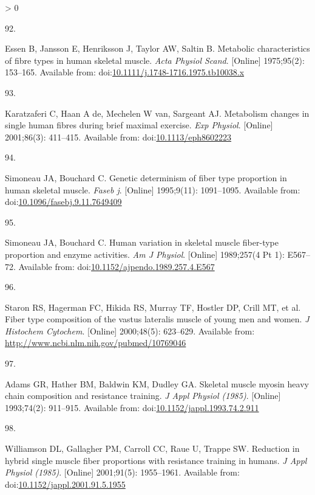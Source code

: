 \documentclass[twoside,10pt]{gihclass} %
\newlength{\cslhangindent}
\newlength{\csllabelwidth}
\newenvironment{CSLReferences}[3] %
 {%
  \setlength{\parindent}{0pt}
  \ifodd #1 \everypar{\setlength{\hangindent}{\cslhangindent}}\ignorespaces\fi
  \ifnum #2 > 0
  \setlength{\parskip}{#2\baselineskip}
  \fi
 }%
 {}
\newcommand{\CSLLeftMargin}[1]{\parbox[t]{\maxof{\widthof{#1}}{\csllabelwidth}}{#1}}
\newcommand{\CSLRightInline}[1]{\parbox[t]{\linewidth}{#1}}
\begin{document}
\begin{CSLReferences}{0}{0}
\leavevmode\hypertarget{ref-RN1885}{}%
\CSLLeftMargin{92. }
\CSLRightInline{Essen B, Jansson E, Henriksson J, Taylor AW, Saltin B. Metabolic characteristics of fibre types in human skeletal muscle. \emph{Acta Physiol Scand}. {[}Online{]} 1975;95(2): 153--165. Available from: doi:\href{https://doi.org/10.1111/j.1748-1716.1975.tb10038.x}{10.1111/j.1748-1716.1975.tb10038.x}}

\leavevmode\hypertarget{ref-RN2801}{}%
\CSLLeftMargin{93. }
\CSLRightInline{Karatzaferi C, Haan A de, Mechelen W van, Sargeant AJ. Metabolism changes in single human fibres during brief maximal exercise. \emph{Exp Physiol}. {[}Online{]} 2001;86(3): 411--415. Available from: doi:\href{https://doi.org/10.1113/eph8602223}{10.1113/eph8602223}}

\leavevmode\hypertarget{ref-RN2798}{}%
\CSLLeftMargin{94. }
\CSLRightInline{Simoneau JA, Bouchard C. Genetic determinism of fiber type proportion in human skeletal muscle. \emph{Faseb j}. {[}Online{]} 1995;9(11): 1091--1095. Available from: doi:\href{https://doi.org/10.1096/fasebj.9.11.7649409}{10.1096/fasebj.9.11.7649409}}

\leavevmode\hypertarget{ref-RN2795}{}%
\CSLLeftMargin{95. }
\CSLRightInline{Simoneau JA, Bouchard C. Human variation in skeletal muscle fiber-type proportion and enzyme activities. \emph{Am J Physiol}. {[}Online{]} 1989;257(4 Pt 1): E567--72. Available from: doi:\href{https://doi.org/10.1152/ajpendo.1989.257.4.E567}{10.1152/ajpendo.1989.257.4.E567}}

\leavevmode\hypertarget{ref-RN285}{}%
\CSLLeftMargin{96. }
\CSLRightInline{Staron RS, Hagerman FC, Hikida RS, Murray TF, Hostler DP, Crill MT, et al. Fiber type composition of the vastus lateralis muscle of young men and women. \emph{J Histochem Cytochem}. {[}Online{]} 2000;48(5): 623--629. Available from: \url{http://www.ncbi.nlm.nih.gov/pubmed/10769046}}

\leavevmode\hypertarget{ref-RN2220}{}%
\CSLLeftMargin{97. }
\CSLRightInline{Adams GR, Hather BM, Baldwin KM, Dudley GA. Skeletal muscle myosin heavy chain composition and resistance training. \emph{J Appl Physiol (1985)}. {[}Online{]} 1993;74(2): 911--915. Available from: doi:\href{https://doi.org/10.1152/jappl.1993.74.2.911}{10.1152/jappl.1993.74.2.911}}

\leavevmode\hypertarget{ref-RN2799}{}%
\CSLLeftMargin{98. }
\CSLRightInline{Williamson DL, Gallagher PM, Carroll CC, Raue U, Trappe SW. Reduction in hybrid single muscle fiber proportions with resistance training in humans. \emph{J Appl Physiol (1985)}. {[}Online{]} 2001;91(5): 1955--1961. Available from: doi:\href{https://doi.org/10.1152/jappl.2001.91.5.1955}{10.1152/jappl.2001.91.5.1955}}


\end{CSLReferences}
\end{document}
